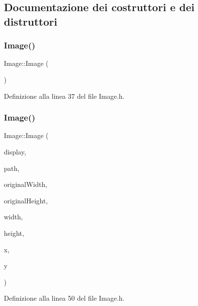 \subsection{Documentazione dei costruttori e dei distruttori}
\mbox{\label{class_image_a58edd1c45b4faeb5f789b0d036d02313}} 
\subsubsection{\texorpdfstring{Image()}{Image()}\hspace{0.1cm}{\footnotesize\ttfamily [1/2]}}
{\footnotesize\ttfamily Image\+::\+Image (\begin{DoxyParamCaption}{ }\end{DoxyParamCaption})\hspace{0.3cm}{\ttfamily [inline]}}



Definizione alla linea 37 del file Image.\+h.

\mbox{\label{class_image_a62706728207cc288e7dd9388aaa6d3ed}} 
\subsubsection{\texorpdfstring{Image()}{Image()}\hspace{0.1cm}{\footnotesize\ttfamily [2/2]}}
{\footnotesize\ttfamily Image\+::\+Image (\begin{DoxyParamCaption}\item[{A\+L\+L\+E\+G\+R\+O\+\_\+\+D\+I\+S\+P\+L\+AY $\ast$}]{display,  }\item[{string}]{path,  }\item[{float}]{original\+Width,  }\item[{float}]{original\+Height,  }\item[{float}]{width,  }\item[{float}]{height,  }\item[{float}]{x,  }\item[{float}]{y }\end{DoxyParamCaption})\hspace{0.3cm}{\ttfamily [inline]}}



Definizione alla linea 50 del file Image.\+h.



